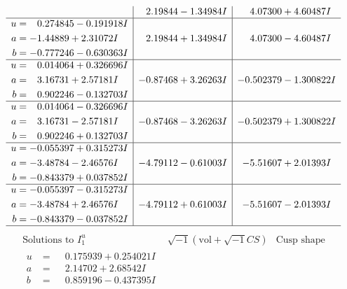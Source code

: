 \documentclass[1p]{elsarticle_modified}
\theoremstyle{definition}
\newcommand{\I}{\sqrt{-1}}
\begin{document}
$$\begin{array}{c|c|c}
 & \phantom{-}2.19844 - 1.34984 I & \phantom{-}4.07300 + 4.60487 I \\ \hline\begin{aligned}
u &= \phantom{-}0.274845 - 0.191918 I \\
a &= -1.44889 + 2.31072 I \\
b &= -0.777246 - 0.630363 I\end{aligned}
 & \phantom{-}2.19844 + 1.34984 I & \phantom{-}4.07300 - 4.60487 I \\ \hline\begin{aligned}
u &= \phantom{-}0.014064 + 0.326696 I \\
a &= \phantom{-}3.16731 + 2.57181 I \\
b &= \phantom{-}0.902246 - 0.132703 I\end{aligned}
 & -0.87468 + 3.26263 I & -0.502379 - 1.300822 I \\ \hline\begin{aligned}
u &= \phantom{-}0.014064 - 0.326696 I \\
a &= \phantom{-}3.16731 - 2.57181 I \\
b &= \phantom{-}0.902246 + 0.132703 I\end{aligned}
 & -0.87468 - 3.26263 I & -0.502379 + 1.300822 I \\ \hline\begin{aligned}
u &= -0.055397 + 0.315273 I \\
a &= -3.48784 - 2.46576 I \\
b &= -0.843379 + 0.037852 I\end{aligned}
 & -4.79112 - 0.61003 I & -5.51607 + 2.01393 I \\ \hline\begin{aligned}
u &= -0.055397 - 0.315273 I \\
a &= -3.48784 + 2.46576 I \\
b &= -0.843379 - 0.037852 I\end{aligned}
 & -4.79112 + 0.61003 I & -5.51607 - 2.01393 I\\
 \hline 
 \end{array}$$\newpage$$\begin{array}{c|c|c}  
\text{Solutions to }I^u_{1}& \I (\text{vol} + \sqrt{-1}CS) & \text{Cusp shape}\\
 \hline 
\begin{aligned}
u &= \phantom{-}0.175939 + 0.254021 I \\
a &= \phantom{-}2.14702 + 2.68542 I \\
b &= \phantom{-}0.859196 - 0.437395 I\end{aligned}

\end{array}$$
\end{document}
